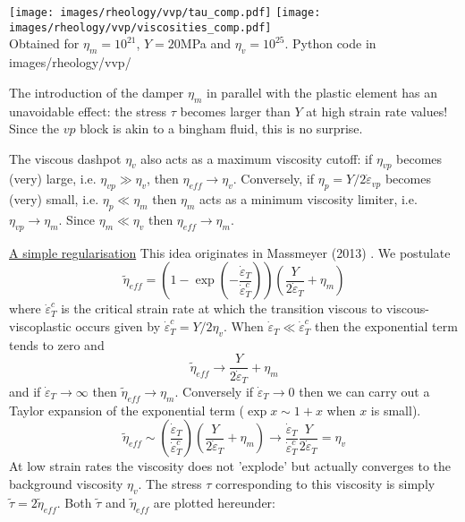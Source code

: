 \begin{center}
\texttt{[image: images/rheology/vvp/tau\_comp.pdf]}
\texttt{[image: images/rheology/vvp/viscosities\_comp.pdf]}\\
{\captionfont Obtained for $\eta_m=10^{21}$, $Y=20$MPa and $\eta_v=10^{25}$. Python code 
in images/rheology/vvp/}
\end{center}

\begin{remark}
The introduction of the damper $\eta_m$ in parallel with the plastic element has an unavoidable
effect: the stress $\tau$ becomes larger than $Y$ at high strain rate values! Since the $vp$ 
block is akin to a bingham fluid, this is no surprise.
\end{remark}

\begin{remark}
The viscous dashpot $\eta_v$ also acts as a maximum viscosity cutoff: if $\eta_{vp}$ becomes (very) large, i.e. $\eta_{vp} \gg \eta_v$, then $\eta_{eff} \rightarrow \eta_v$.
Conversely, if $\eta_p=Y/2\dot\varepsilon_{vp}$ becomes (very) small, i.e. $\eta_p \ll \eta_m$ then $\eta_m$ acts as a minimum viscosity limiter, i.e. $\eta_{vp} \rightarrow \eta_m$. 
Since $\eta_m \ll \eta_v$ then $\eta_{eff} \rightarrow \eta_m$.
\end{remark}

\underline{A simple regularisation} This idea originates in Massmeyer \etal (2013) \cite{madd13}. We postulate
\[
\tilde{\eta}_{eff} = \left(  1 - \exp (- \frac{\dot\varepsilon_T}{\dot\varepsilon_{T}^c}) \right)
\left( \frac{Y}{2 \dot\varepsilon_T} + \eta_m \right)
\]
where $\dot\varepsilon_{T}^c$ is the critical strain  rate at which the transition viscous to 
viscous-viscoplastic occurs given by $\dot\varepsilon_{T}^c=Y/2\eta_v$.
When $\dot\varepsilon_{T} \ll \dot\varepsilon_{T}^c$ then the exponential term tends to zero and 
\[
\tilde{\eta}_{eff} \rightarrow  \frac{Y}{2 \dot\varepsilon_T} + \eta_m 
\]
and if $\dot\varepsilon_{T} \rightarrow \infty$ then $\tilde{\eta}_{eff}\rightarrow \eta_m$.
Conversely if $\dot\varepsilon_T \rightarrow 0$ then we can carry out a Taylor expansion of the exponential 
term ($\exp x \sim 1 + x$ when $x$ is small).
\[
\tilde{\eta}_{eff} \sim \left(  \frac{\dot\varepsilon_T}{\dot\varepsilon_{T}^c} \right)
\left( \frac{Y}{2 \dot\varepsilon_T} + \eta_m \right)
\rightarrow 
\frac{\dot\varepsilon_T}{\dot\varepsilon_{T}^c}  \frac{Y}{2 \dot\varepsilon_T}  = \eta_v
\]
At low strain rates the viscosity does not 'explode' but actually converges to the background viscosity $\eta_v$.
The stress $\tau$ corresponding to this viscosity is simply $\tilde{\tau} = 2 \tilde{\eta}_{eff}$. 
Both $\tilde{\tau}$ and $ \tilde{\eta}_{eff}$ are plotted hereunder:


